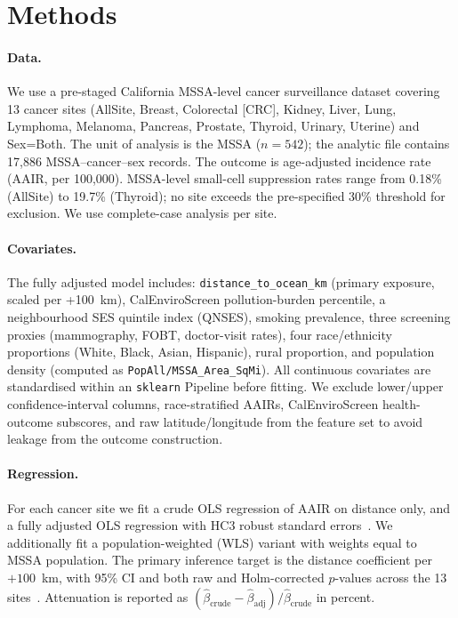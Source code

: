 \documentclass[11pt]{article}
\begin{document}
\section{Methods}
\paragraph{Data.}
We use a pre-staged California MSSA-level cancer surveillance dataset covering 13 cancer sites (AllSite, Breast, Colorectal [CRC], Kidney, Liver, Lung, Lymphoma, Melanoma, Pancreas, Prostate, Thyroid, Urinary, Uterine) and Sex=Both. The unit of analysis is the MSSA ($n=542$); the analytic file contains 17{,}886 MSSA--cancer--sex records. The outcome is age-adjusted incidence rate (AAIR, per 100{,}000). MSSA-level small-cell suppression rates range from 0.18\% (AllSite) to 19.7\% (Thyroid); no site exceeds the pre-specified 30\% threshold for exclusion. We use complete-case analysis per site.

\paragraph{Covariates.}
The fully adjusted model includes: \texttt{distance\_to\_ocean\_km} (primary exposure, scaled per +100~km), CalEnviroScreen pollution-burden percentile, a neighbourhood SES quintile index (QNSES), smoking prevalence, three screening proxies (mammography, FOBT, doctor-visit rates), four race/ethnicity proportions (White, Black, Asian, Hispanic), rural proportion, and population density (computed as \texttt{PopAll/MSSA\_Area\_SqMi}). All continuous covariates are standardised within an \texttt{sklearn} Pipeline before fitting. We exclude lower/upper confidence-interval columns, race-stratified AAIRs, CalEnviroScreen health-outcome subscores, and raw latitude/longitude from the feature set to avoid leakage from the outcome construction.

\paragraph{Regression.}
For each cancer site we fit a crude OLS regression of AAIR on distance only, and a fully adjusted OLS regression with HC3 robust standard errors~\citep{MacKinnonWhite1985HC3}. We additionally fit a population-weighted (WLS) variant with weights equal to MSSA population. The primary inference target is the distance coefficient per $+100$~km, with 95\% CI and both raw and Holm-corrected $p$-values across the 13 sites~\citep{Holm1979}. Attenuation is reported as $(\hat\beta_{\text{crude}}-\hat\beta_{\text{adj}})/\hat\beta_{\text{crude}}$ in percent.
\end{document}
